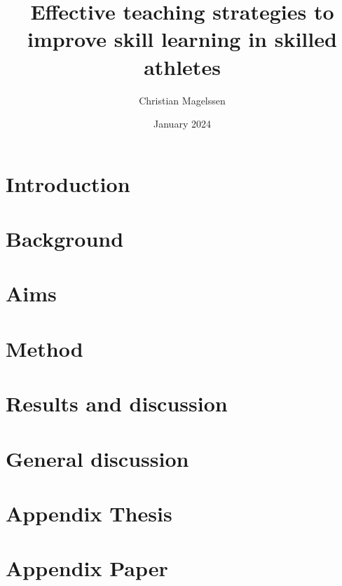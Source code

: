 \documentclass{report}
\title{Effective teaching strategies to improve skill learning in skilled athletes}
\author{Christian Magelssen}
\date{January 2024}
\begin{document}
\newcommand{\RNum}[1]{\uppercase\expandafter{\romannumeral #1\relax}}


\maketitle

\tableofcontents 
\listoffigures




\chapter{Introduction}


\chapter{Background}


\chapter{Aims}



\chapter{Method}



\chapter{Results and discussion}


\chapter{General discussion}


\chapter{Appendix Thesis}



\chapter{Appendix Paper \RNum{1}}





\printbibliography
\end{document}
